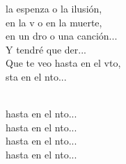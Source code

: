 \begin{cancion}
\begin{chorus}
	la espenza o la ilusión,\\
	en la v o en la muerte, \\
	en un dro o una canción...\\
	Y tendré que der...\\
	Que te veo hasta en el vto, \\
	sta en el nto...\\
	\end{chorus}%
	\jump\\
	hasta en el nto...\\
	hasta en el nto...\\
	hasta en el nto...\\
	hasta en el nto...  \\
\end{cancion}%
